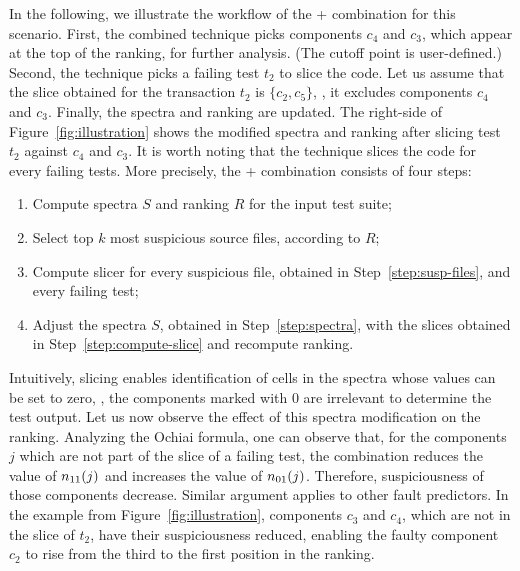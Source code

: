 \documentclass{article}
\begin{document}
In the following, we illustrate the workflow of the \sfl{}+\cs{}
combination for this scenario. First, the combined technique picks
components $c_4$ and $c_3$, which appear at the top of the ranking,
for further analysis. (The cutoff point is user-defined.) Second, the
technique picks a failing test $t_2$ to slice the code.  Let us assume
that the slice obtained for the transaction $t_2$ is $\{c_2, c_5\}$,
\ie, it excludes components $c_4$ and $c_3$. Finally, the spectra and
ranking are updated. The right-side of Figure~\ref{fig:illustration}
shows the modified spectra and ranking after slicing test $t_2$
against $c_4$ and $c_3$. It is worth noting that the technique slices
the code for every failing tests. More precisely, the \sfl{}+\cs{} 
combination consists of four steps:


\begin{enumerate}
  \itemsep0em 
  \item\label{step:spectra} Compute spectra $S$ and ranking $R$ for 
  the input test suite;
  \item\label{step:susp-files} Select top $k$ most suspicious source 
  files, according to $R$;
  \item\label{step:compute-slice} Compute slicer for every suspicious
    file, obtained in Step~\ref{step:susp-files}, and every failing test;
  \item Adjust the spectra $S$, obtained in Step~\ref{step:spectra}, with
    the slices obtained in Step~\ref{step:compute-slice} and recompute ranking.
\end{enumerate}

Intuitively, slicing enables identification of cells in the spectra
whose values can be set to zero, \ie{}, the components marked with 0
are irrelevant to determine the test output. Let us now observe the
effect of this spectra modification on the ranking. Analyzing the
Ochiai formula, one can observe that, for the components $j$ which are
not part of the slice of a failing test, the combination reduces the
value of $n_{11}(j)$ and increases the value of $n_{01}(j)$. Therefore,
suspiciousness of those components decrease. Similar argument applies
to other fault predictors. In the example from
Figure~\ref{fig:illustration}, components $c_3$ and $c_4$, which are
not in the slice of $t_2$, have their suspiciousness reduced, enabling
the faulty component $c_2$ to rise from the third to the first
position in the ranking.
\end{document}

